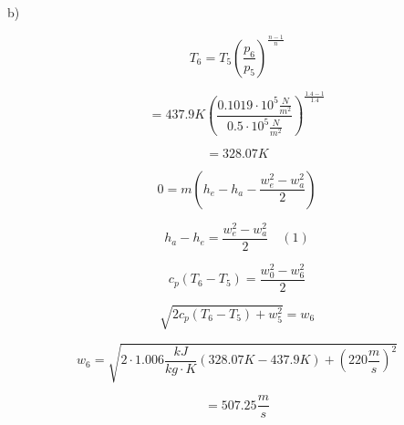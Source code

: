 b)

\[
T_6 = T_5 \left( \frac{p_6}{p_5} \right)^{\frac{n-1}{n}}
\]

\[
= 437.9 K \left( \frac{0.1019 \cdot 10^5 \frac{N}{m^2}}{0.5 \cdot 10^5 \frac{N}{m^2}} \right)^{\frac{1.4-1}{1.4}}
\]

\[
= 328.07 K
\]

\[
0 = m \left( h_e - h_a - \frac{w_e^2 - w_a^2}{2} \right)
\]

\[
h_a - h_e = \frac{w_e^2 - w_a^2}{2} \quad (1)
\]

\[
c_{p} (T_6 - T_5) = \frac{w_0^2 - w_6^2}{2}
\]

\[
\sqrt{2 c_{p} (T_6 - T_5) + w_5^2} = w_6
\]

\[
w_6 = \sqrt{2 \cdot 1.006 \frac{kJ}{kg \cdot K} (328.07 K - 437.9 K) + (220 \frac{m}{s})^2}
\]

\[
= 507.25 \frac{m}{s}
\]